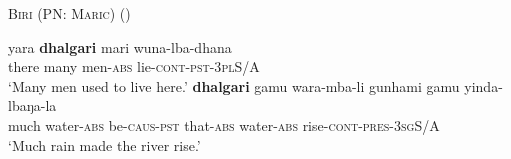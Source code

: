 \documentclass[12pt,egregdoesnotlikesansseriftitles]{scrartcl}
\begin{document}
\begin{exe}
\ex \textsc{Biri (PN: Maric}) \hfill(\cite[54]{terrill98}) \label{manymuch1}
\begin{xlist} 
\ex  \gll  yara    \textbf{dhalgari}    mari        wuna-lba-dhana \\
    there    many        men-\textsc{abs}    lie-\textsc{cont-pst}-3\textsc{pl}S/A \\
    `Many men used to live here.'
\ex \gll \textbf{dhalgari}    gamu        wara-mba-li        gunhami    gamu     yinda-lbaŋa-la  \\   
    much        water-\textsc{abs}    be\textsc{-caus-pst}    that-\textsc{abs}    water-\textsc{abs}  rise-\textsc{cont-pres}-3\textsc{sg}S/A\\
    `Much rain made the river rise.'
\end{xlist}
\end{exe}
\end{document}
